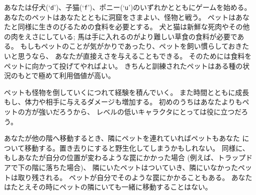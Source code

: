 あなたは仔犬(`{\tt d}')、子猫(`{\tt f}')、ポニー(`{\tt u}')のいずれかとともにゲームを始める。
あなたのペットはあなたとともに洞窟をさまよい、怪物と戦う。
ペットはあなたと同様に生きのびるための食料を必要とする。
犬と猫は新鮮な死肉やその他の肉をえさにしている;
馬は手に入れるのがより難しい草食の食料が必要である。
もしもペットのことが気がかりであったり、ペットを飼い慣らしておきたいと思うなら、
あなたが直接えさを与えることもできる。
そのためには食料をペットに向かって投げてやればよい。
きちんと訓練されたペットはある種の状況のもとで極めて利用価値が高い。

ペットも怪物を倒していくにつれて経験を積んでいく。
また時間とともに成長もし、体力や相手に与えるダメージも増加する。
初めのうちはあなたよりもペットの方が強いだろうから、
レベルの低いキャラクタにとっては役に立つだろう。

あなたが他の階へ移動するとき、隣にペットを連れていればペットもあなた
について移動する。置き去りにすると野生化してしまうかもしれない。
同様に、もしあなたが自分の位置が変わるような罠にかかった場合
(例えば、トラップドアで下の階に落ちた場合)、
隣にいたペットはついていき、隣にいなかったペットは取り残される。
ペットが自分でそのような罠にかかることもある。
あなたはたとえその時にペットの隣にいても一緒に移動することはない。

